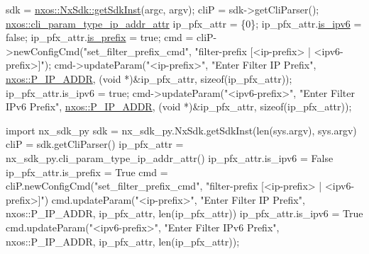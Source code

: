 \begin{DoxyCode}
sdk = \mbox{\hyperlink{classnxos_1_1_nx_sdk_a5050e2d26c40744b4fc7862068a83f39}{nxos::NxSdk::getSdkInst}}(argc, argv);
cliP = sdk->getCliParser();
\mbox{\hyperlink{structnxos_1_1cli__param__type__ip__addr__attr__}{nxos::cli\_param\_type\_ip\_addr\_attr}} ip\_pfx\_attr = \{0\};
ip\_pfx\_attr.\mbox{\hyperlink{structnxos_1_1cli__param__type__ip__addr__attr___a767316999a46b9f012b818131455980b}{is\_ipv6}} = \textcolor{keyword}{false};
ip\_pfx\_attr.\mbox{\hyperlink{structnxos_1_1cli__param__type__ip__addr__attr___a0a059b592a9bc394c9fed521fb5a9552}{is\_prefix}} = \textcolor{keyword}{true};
cmd = cliP->newConfigCmd(\textcolor{stringliteral}{"set\_filter\_prefix\_cmd"},
                         \textcolor{stringliteral}{"filter-prefix [<ip-prefix> | <ipv6-prefix>]"});
cmd->updateParam(\textcolor{stringliteral}{"<ip-prefix>"}, \textcolor{stringliteral}{"Enter Filter IP Prefix"}, \mbox{\hyperlink{namespacenxos_ad220d5ba6a2a5d7edeab55cb89d309eaa082fd4c4bdfc40e03adc023b3d4e5edc}{nxos::P\_IP\_ADDR}},
                 (\textcolor{keywordtype}{void} *)&ip\_pfx\_attr, \textcolor{keyword}{sizeof}(ip\_pfx\_attr));
ip\_pfx\_attr.is\_ipv6 = \textcolor{keyword}{true};
cmd->updateParam(\textcolor{stringliteral}{"<ipv6-prefix>"}, \textcolor{stringliteral}{"Enter Filter IPv6 Prefix"}, \mbox{\hyperlink{namespacenxos_ad220d5ba6a2a5d7edeab55cb89d309eaa082fd4c4bdfc40e03adc023b3d4e5edc}{nxos::P\_IP\_ADDR}},
                 (\textcolor{keywordtype}{void} *)&ip\_pfx\_attr, \textcolor{keyword}{sizeof}(ip\_pfx\_attr));
\end{DoxyCode}



\begin{DoxyCode}
\textcolor{keyword}{import} nx\_sdk\_py
sdk = nx\_sdk\_py.NxSdk.getSdkInst(len(sys.argv), sys.argv)
cliP = sdk.getCliParser()
ip\_pfx\_attr = nx\_sdk\_py.cli\_param\_type\_ip\_addr\_attr()
ip\_pfx\_attr.is\_ipv6 = \textcolor{keyword}{False}
ip\_pfx\_attr.is\_prefix = \textcolor{keyword}{True}
cmd = cliP.newConfigCmd(\textcolor{stringliteral}{"set\_filter\_prefix\_cmd"},
                        \textcolor{stringliteral}{"filter-prefix [<ip-prefix> | <ipv6-prefix>]"})
cmd.updateParam(\textcolor{stringliteral}{"<ip-prefix>"}, \textcolor{stringliteral}{"Enter Filter IP Prefix"}, nxos::P\_IP\_ADDR,
                ip\_pfx\_attr, len(ip\_pfx\_attr))
ip\_pfx\_attr.is\_ipv6 = \textcolor{keyword}{True}
cmd.updateParam(\textcolor{stringliteral}{"<ipv6-prefix>"}, \textcolor{stringliteral}{"Enter Filter IPv6 Prefix"}, nxos::P\_IP\_ADDR,
                ip\_pfx\_attr, len(ip\_pfx\_attr));
\end{DoxyCode}
 \mbox{\label{namespacenxos_ae9180fe1c485780c950cb67a7091162c}} 
